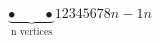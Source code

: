 \documentclass{amsart}
\begin{document}
\thispagestyle{empty}

\begin{align*}
\underbrace{\bullet \qquad \bullet}_{\text{n vertices}} 1 2 3 4 5 6 7 8
n-1 n
\end{align*}
\end{document}

